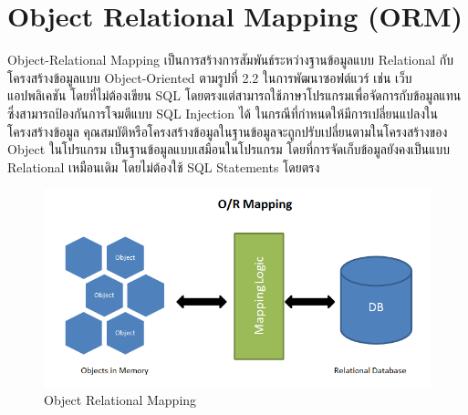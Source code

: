 \section{Object Relational Mapping (ORM)}
Object-Relational Mapping \cite{orm} เป็นการสร้างการสัมพันธ์ระหว่างฐานข้อมูลแบบ Relational กับโครงสร้างข้อมูลแบบ Object-Oriented 
ตามรูปที่ 2.2 ในการพัฒนาซอฟต์แวร์ เช่น เว็บแอปพลิเคชัน โดยที่ไม่ต้องเขียน SQL โดยตรงแต่สามารถใช้ภาษาโปรแกรมเพื่อจัดการกับข้อมูลแทน 
ซึ่งสามารถป้องกันการโจมตีแบบ SQL Injection ได้ ในกรณีที่กำหนดให้มีการเปลี่ยนแปลงในโครงสร้างข้อมูล 
คุณสมบัติหรือโครงสร้างข้อมูลในฐานข้อมูลจะถูกปรับเปลี่ยนตามในโครงสร้างของ Object ในโปรแกรม เป็นฐานข้อมูลแบบเสมือนในโปรแกรม 
โดยที่การจัดเก็บข้อมูลยังคงเป็นแบบ Relational เหมือนเดิม โดยไม่ต้องใช้ SQL Statements โดยตรง
\begin{figure}[h]
  \begin{center}
  \includegraphics[scale=0.3]{resources/ORM.png}
  \end{center}
  \caption[Object Relational Mapping]{Object Relational Mapping}
  \label{fig:orm}
\end{figure}

